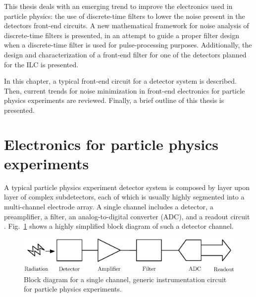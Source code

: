 This thesis deals with an emerging trend to improve the electronics used in particle physics: the use of discrete-time filters to lower the noise present in the detectors \mbox{front-end} circuits. A new mathematical framework for noise analysis of discrete-time filters is presented, in an attempt to guide a proper filter design when a \mbox{discrete-time} filter is used for pulse-processing purposes. Additionally, the design and characterization of a front-end filter for one of the detectors planned for the ILC is presented.

In this chapter, a typical front-end circuit for a detector system is described. Then, current trends for noise minimization in front-end electronics for particle physics experiments are reviewed. Finally, a brief outline of this thesis is presented.

\section{Electronics for particle physics experiments}
A typical particle physics experiment detector system is composed by layer upon layer of complex subdetectors, each of which is usually highly segmented into a \mbox{multi-channel} electrode array. A single channel includes a detector, a  preamplifier, a filter, an analog-to-digital converter (ADC), and a readout circuit \citep{spieler2005semiconductor}. Fig.~\ref{fig:intint} shows a highly simplified block diagram of such a  detector channel. 

\begin{figure}
	\centering
    \includegraphics[width=5in]{./Figures/detector.eps}
	\caption[Diagram for a single channel circuit for particle physics experiments.]{Block diagram for a single channel, generic instrumentation circuit for particle physics experiments.}
	\label{fig:intint}
\end{figure}


